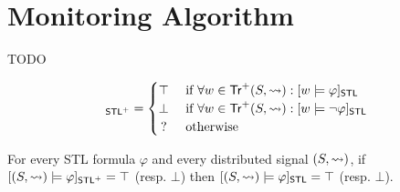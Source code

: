 \section{Monitoring Algorithm} \label{sec:algorithm}
\alert{TODO}

\small
\begin{equation*}
	[(S,{\hb}) \models \varphi]_{\mathsf{STL}^+} = 
	\begin{cases}
		\top & \text{ if } \forall w \in \tr^+(S,{\hb}) : [w \models \varphi]_{\mathsf{STL}} \\
		\bot & \text{ if } \forall w \in \tr^+(S,{\hb}) : [w \models \lnot\varphi]_{\mathsf{STL}} \\
		\,? & \text{ otherwise}
	\end{cases}
\end{equation*}
\normalsize

\begin{theorem}
	For every STL formula $\varphi$ and every distributed signal $(S,{\rightsquigarrow})$, if $[(S,{\rightsquigarrow}) \models \varphi]_{\mathsf{STL}^+} = \top$ (resp. $\bot$) then $[(S,{\rightsquigarrow}) \models \varphi]_{\mathsf{STL}} = \top$ (resp. $\bot$).
\end{theorem}